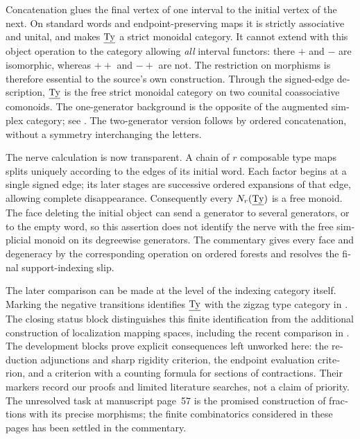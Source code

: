 \begin{otherlanguage}{english}
Concatenation glues the final vertex of one interval to the initial vertex of the next. On standard words and endpoint-preserving maps it is strictly associative and unital, and makes $\underline{\mathrm{Ty}}$ a strict monoidal category. It cannot extend with this object operation to the category allowing \emph{all} interval functors: there $+$ and $-$ are isomorphic, whereas $++$ and $-+$ are not. The restriction on morphisms is therefore essential to the source's own construction. Through the signed-edge description, $\underline{\mathrm{Ty}}$ is the free strict monoidal category on two counital coassociative comonoids. The one-generator background is the opposite of the augmented simplex category; see \citet[Appendix~D, Proposition~D.2]{AguiarMahajan2010}. The two-generator version follows by ordered concatenation, without a symmetry interchanging the letters.

The nerve calculation is now transparent. A chain of $r$ composable type maps splits uniquely according to the edges of its initial word. Each factor begins at a single signed edge; its later stages are successive ordered expansions of that edge, allowing complete disappearance. Consequently every $N_r(\underline{\mathrm{Ty}})$ is a free monoid. The face deleting the initial object can send a generator to several generators, or to the empty word, so this assertion does not identify the nerve with the free simplicial monoid on its degreewise generators. The commentary gives every face and degeneracy by the corresponding operation on ordered forests and resolves the final support-indexing slip.

The later comparison can be made at the level of the indexing category itself. Marking the negative transitions identifies $\underline{\mathrm{Ty}}$ with the zigzag type category in \citet[Definition~3.5]{MazelGee2018Hammocks}. The closing status block distinguishes this finite identification from the additional construction of localization mapping spaces, including the recent comparison in \citet[Theorem~1.9 and Corollary~1.11]{ArakawaCnossen2026}. The development blocks prove explicit consequences left unworked here: the reduction adjunctions and sharp rigidity criterion, the endpoint evaluation criterion, and a criterion with a counting formula for sections of contractions. Their markers record our proofs and limited literature searches, not a claim of priority. The unresolved task at manuscript page~57 is the promised construction of fractions with its precise morphisms; the finite combinatorics considered in these pages has been settled in the commentary.
\end{otherlanguage}
\dgrchunkend
